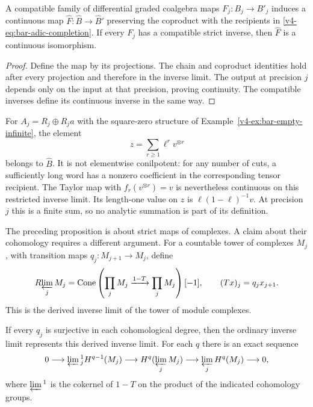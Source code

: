 \begin{proposition}\label{v4-prop:bar-adic-maps}
A compatible family of differential graded coalgebra maps
\(F_j:B_j\to B'_j\) induces a continuous map
\(\widehat F:\widehat B\to\widehat B'\) preserving the
coproduct with the recipients in
\eqref{v4-eq:bar-adic-completion}. If every \(F_j\) has a
compatible strict inverse, then \(\widehat F\) is a continuous
isomorphism.
\end{proposition}

\begin{proof}
Define the map by its projections. The chain and coproduct
identities hold after every projection and therefore in the
inverse limit. The output at precision \(j\) depends only on
the input at that precision, proving continuity. The compatible
inverses define its continuous inverse in the same way.
\end{proof}

For \(A_j=R_j\oplus R_ja\) with the square-zero structure of
Example~\ref{v4-ex:bar-empty-infinite}, the element
\[
 z=\sum_{r\geq1}\ell^rv^{\otimes r}
\]
belongs to \(\widehat B\). It is not elementwise conilpotent:
for any number of cuts, a sufficiently long word has a nonzero
coefficient in the corresponding tensor recipient. The Taylor
map with \(f_r(v^{\otimes r})=v\) is nevertheless continuous
on this restricted inverse limit. Its length-one value on \(z\)
is \(\ell(1-\ell)^{-1}v\). At precision \(j\) this is a finite
sum, so no analytic summation is part of its definition.

The preceding proposition is about strict maps of complexes. A
claim about their cohomology requires a different argument. For
a countable tower of complexes \(M_j\), with transition maps
\(q_j:M_{j+1}\to M_j\), define
\[
 R\!\varprojlim_jM_j
   =\operatorname{Cone}\left(
       \prod_jM_j\xrightarrow{1-T}\prod_jM_j\right)[-1],
 \qquad (Tx)_j=q_jx_{j+1}.
\]
This is the derived inverse limit of the tower of module complexes.

\begin{proposition}\label{v4-prop:bar-milnor}
If every \(q_j\) is surjective in each cohomological degree,
then the ordinary inverse limit represents this derived inverse
limit. For each \(q\) there is an exact sequence
\[
 0\longrightarrow\varprojlim{}^{1}_j H^{q-1}(M_j)
 \longrightarrow H^q(\varprojlim_jM_j)
 \longrightarrow\varprojlim_jH^q(M_j)\longrightarrow0,
\]
where \(\varprojlim{}^1\) is the cokernel of \(1-T\) on the
product of the indicated cohomology groups.
\end{proposition}

